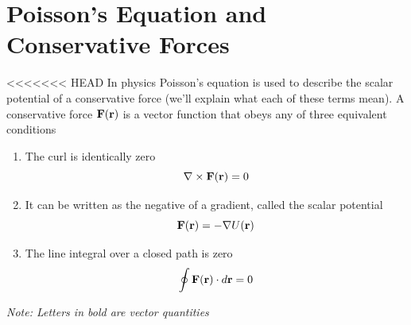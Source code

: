 \section*{Poisson's Equation and Conservative Forces}
<<<<<<< HEAD
In physics Poisson's equation is used to describe the scalar potential of a conservative force (we'll explain what each of these terms mean).
A conservative force $\bold{F}(\bold{r})$ is a vector function that obeys any of three equivalent conditions
\begin{enumerate}
	\item The curl is identically zero
		\[\nabla \times \bold{F}(\bold{r}) = 0\]
	\item It can be written as the negative of a gradient, called the scalar potential
		\[\bold{F}(\bold{r}) = - \nabla U(\bold{r})\]
	\item The line integral over a closed path is zero
		\[\oint \bold{F}(\bold{r}) \cdot d\bold{r} = 0\]

\end{enumerate}
\textit{Note: Letters in bold are vector quantities}

